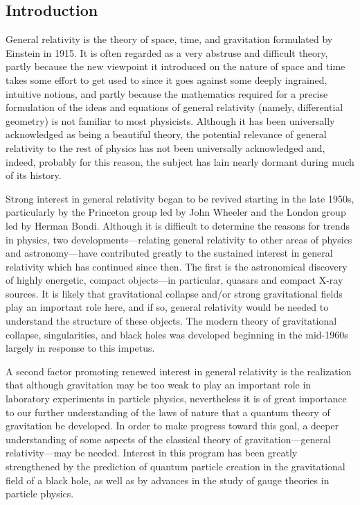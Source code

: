 
\subsection{Introduction}\label{sec:1.1}

General relativity is the theory of space, time, and gravitation formulated by
Einstein in 1915. It is often regarded as a very abstruse and difficult theory, partly
because the new viewpoint it introduced on the nature of space and time takes some
effort to get used to since it goes against some deeply ingrained, intuitive notions,
and partly because the mathematics required for a precise formulation of the ideas
and equations of general relativity (namely, differential geometry) is not familiar to
most physicists. Although it has been universally acknowledged as being a beautiful
theory, the potential relevance of general relativity to the rest of physics has not been
universally acknowledged and, indeed, probably for this reason, the subject has lain
nearly dormant during much of its history.

Strong interest in general relativity began to be revived starting in the late 1950s,
particularly by the Princeton group led by John Wheeler and the London group led by
Herman Bondi. Although it is difficult to determine the reasons for trends in
physics, two developments---relating general relativity to other areas of physics and
astronomy---have contributed greatly to the sustained interest in general relativity
which has continued since then. The first is the astronomical discovery of highly
energetic, compact objects---in particular, quasars and compact X-ray sources. It is
likely that gravitational collapse and/or strong gravitational fields play an important
role here, and if so, general relativity would be needed to understand the structure
of these objects. The modern theory of gravitational collapse, singularities, and black
holes was developed beginning in the mid-1960s largely in response to this impetus.

A second factor promoting renewed interest in general relativity is the realization
that although gravitation may be too weak to play an important role in laboratory
experiments in particle physics, nevertheless it is of great importance to our further
understanding of the laws of nature that a quantum theory of gravitation be
developed. In order to make progress toward this goal, a deeper understanding of
some aspects of the classical theory of gravitation---general relativity---may be
needed. Interest in this program has been greatly strengthened by the prediction of
quantum particle creation in the gravitational field of a black hole, as well as by
advances in the study of gauge theories in particle physics.

